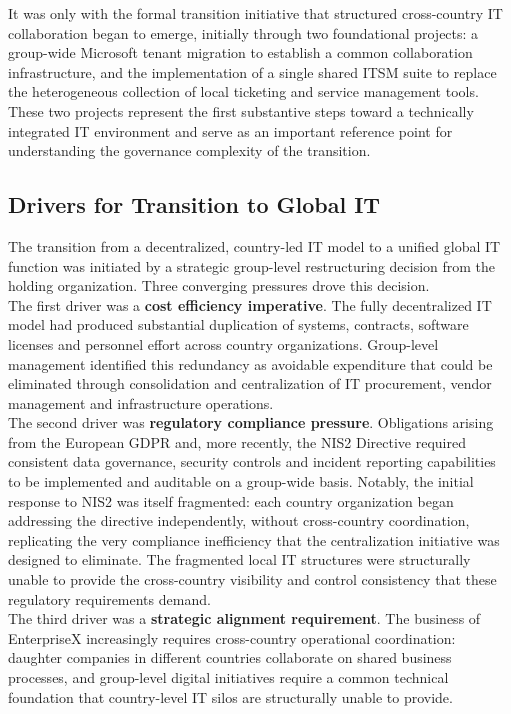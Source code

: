 It was only with the formal transition initiative that structured cross-country IT collaboration began to emerge, initially through two foundational projects: a group-wide Microsoft tenant migration to establish a common collaboration infrastructure, and the implementation of a single shared \ac{ITSM} suite to replace the heterogeneous collection of local ticketing and service management tools.
These two projects represent the first substantive steps toward a technically integrated IT environment and serve as an important reference point for understanding the governance complexity of the transition.

\subsection{Drivers for Transition to Global IT}
\label{subsec:DriversForTransitionToGlobalIT}
The transition from a decentralized, country-led IT model to a unified global IT function was initiated by a strategic group-level restructuring decision from the holding organization.
Three converging pressures drove this decision.
\\
The first driver was a \textbf{cost efficiency imperative}.
The fully decentralized IT model had produced substantial duplication of systems, contracts, software licenses and personnel effort across country organizations.
Group-level management identified this redundancy as avoidable expenditure that could be eliminated through consolidation and centralization of IT procurement, vendor management and infrastructure operations.
\\
The second driver was \textbf{regulatory compliance pressure}.
Obligations arising from the European \ac{GDPR} and, more recently, the \ac{NIS2} Directive required consistent data governance, security controls and incident reporting capabilities to be implemented and auditable on a group-wide basis.
Notably, the initial response to \ac{NIS2} was itself fragmented: each country organization began addressing the directive independently, without cross-country coordination, replicating the very compliance inefficiency that the centralization initiative was designed to eliminate.
The fragmented local IT structures were structurally unable to provide the cross-country visibility and control consistency that these regulatory requirements demand.
\\
The third driver was a \textbf{strategic alignment requirement}.
The business of EnterpriseX increasingly requires cross-country operational coordination: daughter companies in different countries collaborate on shared business processes, and group-level digital initiatives require a common technical foundation that country-level IT silos are structurally unable to provide.
